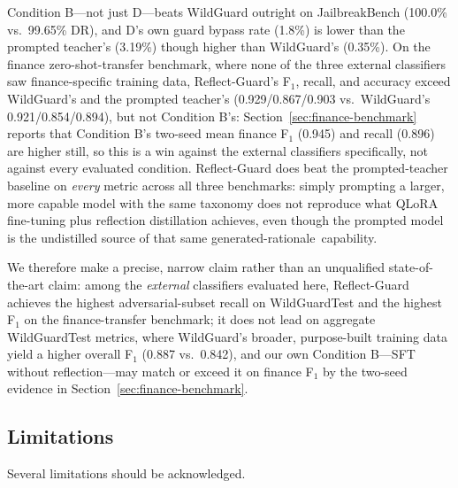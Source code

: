 \documentclass[superintelligence,article,accept,moreauthors]{Definitions/mdpi}
\begin{document}
Condition B---not just D---beats WildGuard outright on JailbreakBench (100.0\% vs.\ 99.65\% DR), and D's own guard bypass rate (1.8\%) is lower than the prompted teacher's (3.19\%) though higher than WildGuard's (0.35\%). On the finance zero-shot-transfer benchmark, where none of the three external classifiers saw finance-specific training data, Reflect-Guard's F$_1$, recall, and accuracy exceed WildGuard's and the prompted teacher's (0.929/0.867/0.903 vs.\ WildGuard's 0.921/0.854/0.894), but not Condition B's: Section~\ref{sec:finance-benchmark} reports that Condition B's two-seed mean finance F$_1$ (0.945) and recall (0.896) are higher still, so this is a win against the external classifiers specifically, not against every evaluated condition. Reflect-Guard does beat the prompted-teacher baseline on \emph{every} metric across all three benchmarks: simply prompting a larger, more capable model with the same taxonomy does not reproduce what QLoRA fine-tuning plus reflection distillation achieves, even though the prompted model is the undistilled source of that same generated-\mbox{rationale capability.}

We therefore make a precise, narrow claim rather than an unqualified state-of-the-art claim: among the \emph{external} classifiers evaluated here, Reflect-Guard achieves the highest adversarial-subset recall on WildGuardTest and the highest F$_1$ on the finance-transfer benchmark; it does not lead on aggregate WildGuardTest metrics, where WildGuard's broader, purpose-built training data yield a higher overall F$_1$ (0.887 vs.\ 0.842), and our own Condition B---SFT without reflection---may match or exceed it on finance F$_1$ by the two-seed evidence in Section~\ref{sec:finance-benchmark}.

\subsection{Limitations}
\label{sec:limitations}

Several limitations should be acknowledged.
\end{document}
